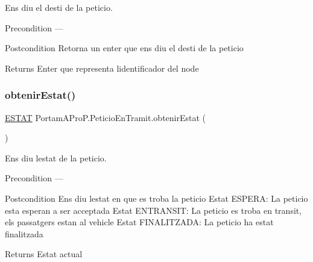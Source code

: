 Ens diu el desti de la peticio. 

\begin{DoxyPrecond}{Precondition}
--- 
\end{DoxyPrecond}
\begin{DoxyPostcond}{Postcondition}
Retorna un enter que ens diu el desti de la peticio 
\end{DoxyPostcond}
\begin{DoxyReturn}{Returns}
Enter que representa l\textquotesingle{}identificador del node 
\end{DoxyReturn}
\mbox{\label{class_portam_a_pro_p_1_1_peticio_en_tramit_aa5d94375d300e485d8173fdfb1fc2bdd}} 
\subsubsection{\texorpdfstring{obtenir\+Estat()}{obtenirEstat()}}
{\footnotesize\ttfamily \hyperlink{enum_portam_a_pro_p_1_1_peticio_en_tramit_1_1_e_s_t_a_t}{E\+S\+T\+AT} Portam\+A\+Pro\+P.\+Peticio\+En\+Tramit.\+obtenir\+Estat (\begin{DoxyParamCaption}{ }\end{DoxyParamCaption})}



Ens diu l\textquotesingle{}estat de la peticio. 

\begin{DoxyPrecond}{Precondition}
--- 
\end{DoxyPrecond}
\begin{DoxyPostcond}{Postcondition}
Ens diu l\textquotesingle{}estat en que es troba la peticio Estat E\+S\+P\+E\+RA\+: La peticio esta esperan a ser acceptada Estat E\+N\+T\+R\+A\+N\+S\+IT\+: La peticio es troba en transit, els passatgers estan al vehicle Estat F\+I\+N\+A\+L\+I\+T\+Z\+A\+DA\+: La peticio ha estat finalitzada 
\end{DoxyPostcond}
\begin{DoxyReturn}{Returns}
Estat actual 
\end{DoxyReturn}
\mbox{\label{class_portam_a_pro_p_1_1_peticio_en_tramit_adf1b04d160bb3495c5c087fe7ddaee2e}} 
